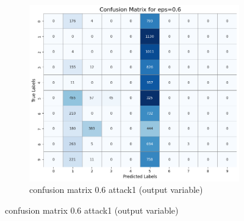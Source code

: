 \documentclass[11pt,onside]{article}
\begin{document}
\begin{figure}[h]
  \centering
  \begin{subfigure}[b]{0.49\textwidth}
    \centering
    \includegraphics[width=\textwidth]{V2_images/target_confusion_matrix_eps_0.6_attack_1.png}
    \caption{confusion matrix 0.6 attack1 (output variable)}
    \label{fig:image1}
  \end{subfigure}
  
\end{figure}
\end{document}

